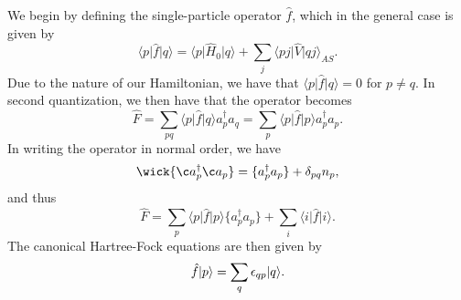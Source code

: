 We begin by defining the single-particle operator $\hat{f}$, which in the general case is given by
\begin{equation*}
    \langle p \vert \hat{f} \vert q \rangle = \langle p \vert \hat{H}_0 \vert q \rangle + \sum_{j} \langle p j \vert \hat{V} \vert q j \rangle_{AS}.
\end{equation*}
Due to the nature of our Hamiltonian, we have that $\langle p \vert \hat{f} \vert q \rangle = 0$ for $p \neq q$.
In second quantization, we then have that the operator becomes
\begin{equation*}
    \hat{F}
    = \sum_{pq} \langle p \vert \hat{f} \vert q \rangle a_p^\dagger a_q
    = \sum_{p} \langle p \vert \hat{f} \vert p \rangle a_p^\dagger a_p.
\end{equation*}
In writing the operator in normal order, we have
\begin{equation*}
    \wick{\c a_p^\dagger \c a_p} = \{ a_p^\dagger a_p \} + \delta_{pq} n_p,
\end{equation*}
and thus
\begin{equation*}
    \hat{F} = \sum_{p} \langle p \vert \hat{f} \vert p \rangle \{ a_p^\dagger a_p \} + \sum_{i} \langle i \vert \hat{f} \vert i \rangle.
\end{equation*}
The canonical Hartree-Fock equations are then given by
\begin{equation*}
    \hat{f} \lvert p\rangle = \sum_{q} \epsilon_{qp} \lvert q\rangle.
\end{equation*}
